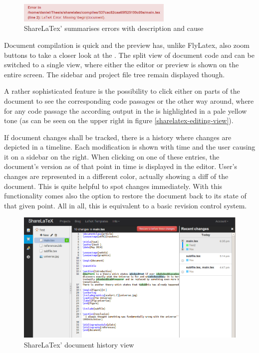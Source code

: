 \begin{figure}[h!]
	\centering
		\includegraphics[width=0.66\textwidth]{images/sharelatex-error.png}
	\caption{ShareLaTex' summarises errors with description and cause}
\end{figure}

Document compilation is quick and the preview has, unlike FlyLatex, also zoom buttons to take a closer look at the . The split view of document code and  can be switched to a single view, where either the editor or preview is shown on the entire screen. The sidebar and project file tree remain displayed though.

A rather sophisticated feature is the possibility to click either on parts of the document to see the corresponding code passages or the other way around, where for any code passage the according output in the  is highlighted in a pale yellow tone (as can be seen on the upper right in figure \ref{sharelatex-editing-view}).

If document changes shall be tracked, there is a history where changes are depicted in a timeline. Each modification is shown with time and the user causing it on a sidebar on the right. When clicking on one of these entries, the document's version as of that point in time is displayed in the editor. User's changes are represented in a different color, actually showing a diff of the document. This is quite helpful to spot changes immediately. With this functionality comes also the option to restore the document back to its state of that given point. All in all, this is equivalent to a basic revision control system.

\begin{figure}[h!]
	\centering
		\includegraphics[width=\textwidth]{images/sharelatex-history.png}
	\caption{ShareLaTex' document history view}
\end{figure}

